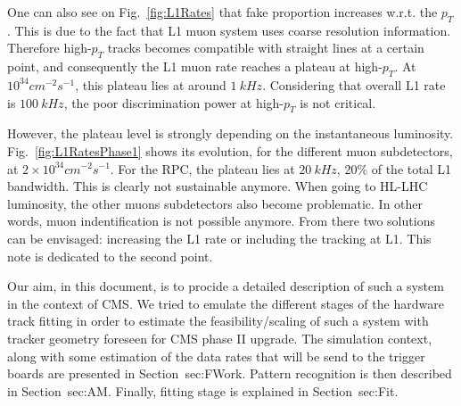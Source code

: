 \noindent One can also see on Fig.~\ref{fig:L1Rates} that fake proportion increases w.r.t. the $p_T$. This is due to the fact that L1 muon system uses coarse resolution information. Therefore high-$p_T$ tracks becomes compatible with straight lines at a certain point, and consequently the L1 muon rate reaches a plateau at high-$p_T$. At $10^{34}cm^{-2}s^{-1}$, this plateau lies at around $1~kHz$. Considering that overall L1 rate is $100~kHz$, the poor discrimination power at high-$p_T$ is not critical.

\noindent However, the plateau level is strongly depending on the instantaneous luminosity. Fig.~\ref{fig:L1RatesPhase1} shows its evolution, for the different muon subdetectors, at $2\times 10^{34}cm^{-2}s^{-1}$. For the RPC, the plateau lies at $20~kHz$, 20\% of the total L1 bandwidth. This is clearly not sustainable anymore. When going to HL-LHC luminosity, the other muons subdetectors also become problematic. In other words, muon indentification is not possible anymore. From there two solutions can be envisaged: increasing the L1 rate or including the tracking at L1. This note is dedicated to the second point.  

\noindent Our aim, in this document, is to procide a detailed description of such a system in the context of CMS. We tried to emulate the different stages of the hardware track fitting in order to estimate the feasibility/scaling of such a system with tracker geometry foreseen for CMS phase II upgrade. The simulation context, along with some estimation of the data rates that will be send to the trigger boards are presented in Section~{sec:FWork}. Pattern recognition is then described in Section~{sec:AM}. Finally, fitting stage is explained in Section~{sec:Fit}.

\clearpage
